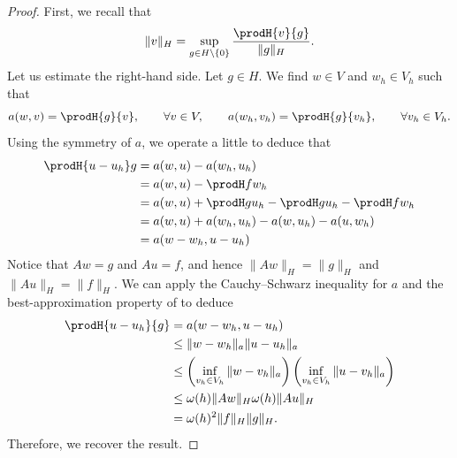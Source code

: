 \begin{proof}
    First, we recall that
    \begin{equation*}
        \| v \|_H = \sup_{g \in H \setminus \{0\}} \frac{\prodH{v}{g}}{\|g\|_H}.
    \end{equation*}
    Let us estimate the right-hand side. Let $g \in H$. We find $w \in V$ and $w_h \in V_h$ such that
    \begin{equation}
        a(w,v) = \prodH{g}{v} , \qquad \forall v \in V,
        \qquad
        a(w_h,v_h) = \prodH{g}{v_h} , \qquad \forall v_h \in V_h.
    \end{equation}
    Using the symmetry of $a$, we operate a little to deduce that
    \begin{align*}
        \prodH{u - u_h} g
         & =a(w,u) - a(w_h,u_h)                                       \\
         & =a(w,u) - \prodH f {w_h}                                   \\
         & =a(w,u) + \prodH g {u_h} - \prodH g {u_h} - \prodH f {w_h} \\
         & =a(w,u) + a(w_h,u_h) - a(w,u_h) - a(u, w_h)                \\
         & = a(w - w_h, u - u_h)
    \end{align*}
    Notice that $A w = g$ and $Au = f$, and hence $\| Aw \|_H = \|g\|_H$ and $\|Au\|_H = \|f\|_H$. We can apply the Cauchy--Schwarz inequality for $a$ and the best-approximation property of  to deduce
    \begin{align*}
        \prodH{u - u_h}{g}
         & = a(w - w_h, u - u_h)                                                                                    \\
         & \le \|w - w_h\|_a \|u - u_h\|_a                                                                          \\
         & \le \left( \inf_{v_h \in V_h } \| w - v_h \|_a \right) \left( \inf_{v_h \in V_h} \| u - v_h \|_a \right) \\
         & \le \omega(h) \| A w \|_H \omega(h) \| A u \|_H                                                          \\
         & = \omega(h)^2 \| f \|_H \| g\|_{H}.
    \end{align*}
    Therefore, we recover the result.
\end{proof}

